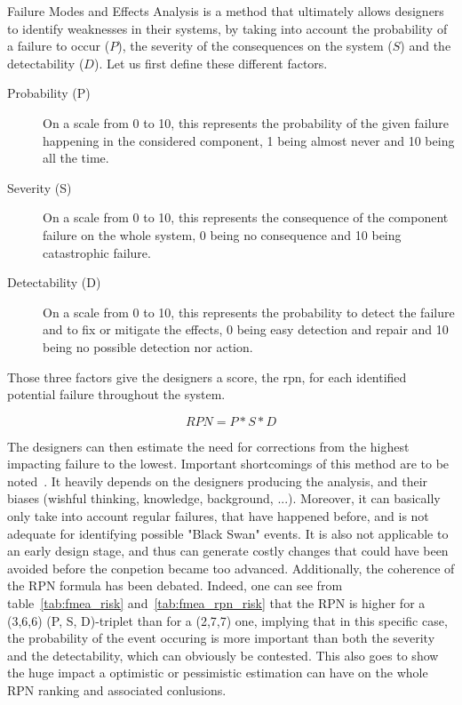 Failure Modes and Effects Analysis is a method that ultimately allows designers to identify weaknesses in their systems, by taking into account the probability of a failure to occur ($P$), the severity of the consequences on the system ($S$) and the detectability ($D$). Let us first define these different factors.

\begin{description}

\item[Probability (P)]
On a scale from 0 to 10, this represents the probability of the given failure happening in the considered component, 1 being almost never and 10 being all the time.

\item[Severity (S)]
On a scale from 0 to 10, this represents the consequence of the component failure on the whole system, 0 being no consequence and 10 being catastrophic failure.

\item[Detectability (D)]
On a scale from 0 to 10, this represents the probability to detect the failure and to fix or mitigate the effects, 0 being easy detection and repair and 10 being no possible detection nor action.

\end{description}

Those three factors give the designers a score, the \gls{rpn}, for each identified potential failure throughout the system.

\begin{equation}
RPN = P * S * D
\end{equation}

The designers can then estimate the need for corrections from the highest impacting failure to the lowest. Important shortcomings of this method are to be noted~\cite{liu2013}. It heavily depends on the designers producing the analysis, and their biases (wishful thinking, knowledge, background, ...). Moreover, it can basically only take into account regular failures, that have happened before, and is not adequate for identifying possible "Black Swan" events. It is also not applicable to an early design stage, and thus can generate costly changes that could have been avoided before the conpetion became too advanced. Additionally, the coherence of the RPN formula has been debated. Indeed, one can see from table~\ref{tab:fmea_risk} and~\ref{tab:fmea_rpn_risk} that the RPN is higher for a (3,6,6) (P, S, D)-triplet than for a (2,7,7) one, implying that in this specific case, the probability of the event occuring is more important than both the severity and the detectability, which can obviously be contested. This also goes to show the huge impact a optimistic or pessimistic estimation can have on the whole RPN ranking and associated conlusions.


